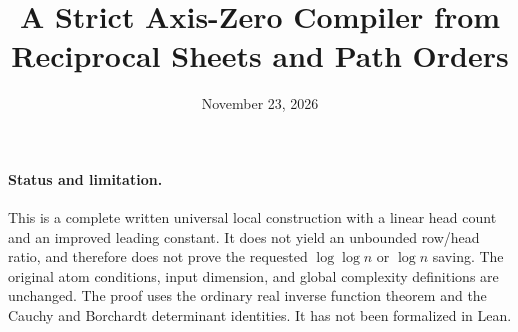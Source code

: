 \documentclass[11pt]{article}
\title{A Strict Axis-Zero Compiler from Reciprocal Sheets and Path Orders}
\author{}
\date{November 23, 2026}
\begin{document}
\maketitle

\paragraph{Status and limitation.}
This is a complete written universal local construction with a linear
head count and an improved leading constant. It does not yield an
unbounded row/head ratio, and therefore does not prove the requested
$\log\log n$ or $\log n$ saving. The original atom conditions, input
dimension, and global complexity definitions are unchanged. The proof
uses the ordinary real inverse function theorem and the Cauchy and
Borchardt determinant identities. It has not been formalized in Lean.
\end{document}
